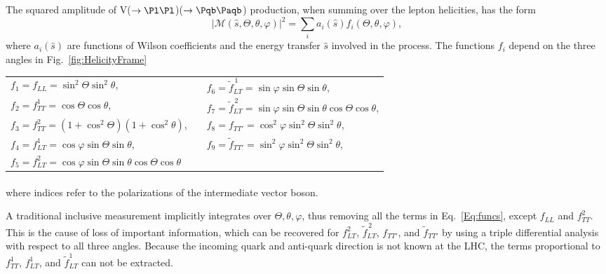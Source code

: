 \documentclass[a4paper,11pt]{article}
\newcommand{\Pb}{{{\Pqb}}\xspace}
\newcommand{\PAb}{{{{\Paqb}}}\xspace}
\renewcommand{\PV}{{{{V}}}\xspace}
\begin{document}
The squared amplitude of \PV($\to \Pl \Pl$)\PH($\to \Pb \PAb$) production, when summing over the lepton helicities, has the form
\begin{equation}
	|\mathcal{M} \left(\hat{s}, \Theta, \theta, \varphi \right)|^{2} = {\sum}_{i} a_i \left(\hat{s}\right) f_i \left(\Theta, \theta, \varphi \right),
\label{Eq:Amplitude}
\end{equation}
where $a_i\left(\hat{s}\right)$ are functions of Wilson coefficients and the energy transfer $\hat{s}$ involved in the process.
The functions $f_i$ depend on the three angles in Fig.~\ref{fig:HelicityFrame}

{\renewcommand{\arraystretch}{1.3}
\begin{table}[h!]
\begin{tabular}{lcl}
    $f_{1} = f_{LL} = \sin^{2}\Theta \sin^{2}\theta$, && $f_{6} = \tilde{f}^{\,1}_{LT} = \sin\varphi \sin\Theta \sin\theta, $\\
    $f_{2} = f^1_{TT} = \cos\Theta \cos\theta$, &&$f_{7} = \tilde{f}^{\,2}_{LT} = \sin\varphi \sin\Theta \sin\theta \cos\Theta \cos\theta$,\\
    $f_{3} = f^2_{TT} = (1+\cos^{2}\Theta)(1+ \cos^{2}\theta)$, && $f_{8} = f_{TT'} = \cos^{2}\varphi \sin^{2}{\Theta} \sin^{2}{\theta}$,\\
    $f_{4} = f^1_{LT} = \cos\varphi \sin\Theta \sin\theta$,&& $f_{9} = \tilde{f}_{TT'} =  \sin^{2}{\varphi} \sin^{2}{\Theta} \sin^{2}{\theta}$,\\
    $f_{5} = f^2_{LT} = \cos\varphi \sin\Theta \sin\theta \cos\Theta \cos\theta$
\end{tabular}
\end{table}
}
\vspace{-1.4cm}\begin{equation}
\phantom{x}\label{Eq:funcs}\end{equation}
\noindent where indices refer to the polarizations of the intermediate vector boson.

A traditional inclusive measurement implicitly integrates over $\Theta, \theta, \varphi$, thus removing all the terms in Eq.~\eqref{Eq:funcs}, except $f_{LL}$ and $f^2_{TT}$. 
This is the cause of loss of important information, which can be recovered for $f^2_{LT}$, $\tilde f^{\,2}_{LT}$, $f_{TT'}$, and $\tilde f_{TT'}$  by using a triple differential analysis with respect to all three angles. 
Because the incoming quark and anti-quark direction is not known at the LHC, the terms proportional to $f^1_{TT}$, $f^1_{LT}$, and $\tilde{f}^1_{LT}$ can not be extracted.
\end{document}
